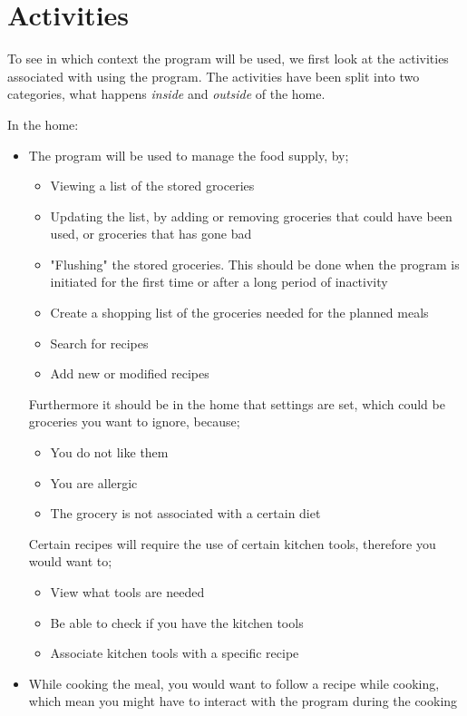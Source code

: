 \section{Activities}
To see in which context the program will be used, we first look at the activities associated with using the program. The activities have been split into two categories, what happens \textit{inside} and \textit{outside} of the home.

In the home:
\begin{itemize}
\item The program will be used to manage the food supply, by;
	\begin{itemize}
		\item Viewing a list of the stored groceries
		\item Updating the list, by adding or removing groceries that could have been used, or groceries that has gone bad
		\item "Flushing" the stored groceries. This should be done when the program is initiated for the first time or after a long period of inactivity
		\item Create a shopping list of the groceries needed for the planned meals
		\item Search for recipes
		\item Add new or modified recipes
	\end{itemize}
	Furthermore it should be in the home that settings are set, which could be groceries you want to ignore, because;
	\begin{itemize}
		\item You do not like them
		\item You are allergic
		\item The grocery is not associated with a certain diet
	\end{itemize}
	Certain recipes will require the use of certain kitchen tools, therefore you would want to;
	\begin{itemize}
		\item View what tools are needed
		\item Be able to check if you have the kitchen tools
		\item Associate kitchen tools with a specific recipe
	\end{itemize}
	\item While cooking the meal, you would want to follow a recipe while cooking, which mean you might have to interact with the program during the cooking
\end{itemize}

